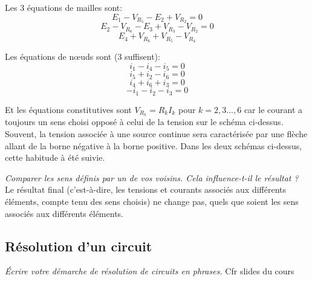 {{Les 3 équations de mailles sont:
$$E_1-V_{R_5}-E_2+V_{R_2}=0$$
$$E_2-V_{R_6}-E_3+V_{R_3}-V_{R_2}=0$$
$$E_4+V_{R_6}+V_{R_5}-V_{R_4}$$

Les équations de nœuds sont (3 suffisent):
$$i_1-i_4-i_5=0$$
$$i_5+i_2-i_6=0$$
$$i_4+i_6+i_3=0$$
$$-i_1-i_2-i_3=0$$

Et les équations constitutives sont $V_{R_k}=R_k I_k$ pour $k=2,3...,6$ car le courant a toujours un sens choisi opposé à celui de la tension sur le schéma ci-dessus.\\

Souvent, la tension associée à une source continue sera caractérisée par une flèche allant de la borne négative à la borne positive. Dans les deux schémas ci-dessus, cette habitude à été suivie.
}

\Question
{%
\textit{Comparer les sens définis par un de vos voisins. Cela influence-t-il le résultat ?}
}
{%
Le résultat final (c'est-à-dire, les tensions et courants associés aux différents éléments, compte tenu des sens choisis) ne change pas, quels que soient les sens associés aux différents éléments.
}

\subsection{Résolution d'un circuit}
\Question
{%
\textit{Écrire votre démarche de résolution de circuits en phrases.}
}
{%
Cfr slides du cours
}

}
